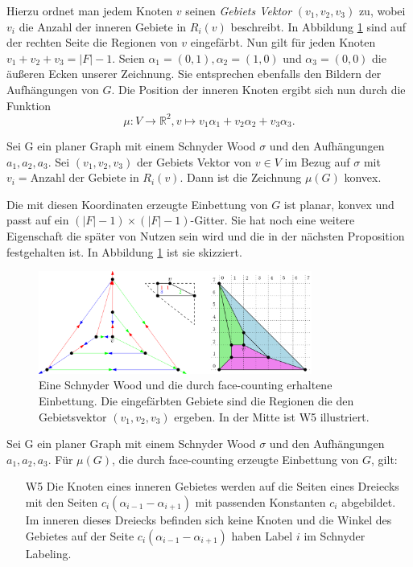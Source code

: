 Hierzu ordnet man jedem Knoten $v$ seinen \textit{Gebiets Vektor} $(v_1,v_2,v_3)$ zu, wobei $v_i$ die Anzahl der inneren Gebiete in $R_i(v)$ beschreibt. In Abbildung \ref{face_counting} sind auf der rechten Seite die Regionen von $v$ eingefärbt. Nun gilt für jeden Knoten $v_1+v_2+v_3 = |F|-1$. Seien $\alpha_1 = (0,1),\alpha_2 = (1,0)$ und $\alpha_3 = (0,0)$ die äußeren Ecken unserer Zeichnung. Sie entsprechen ebenfalls den Bildern der Aufhängungen von $G$. Die Position der inneren Knoten ergibt sich nun durch die Funktion 
$$\mu: V \to \mathbb{R}^2,v\mapsto v_1\alpha_1 + v_2\alpha_2+v_3\alpha_3.$$ 

\begin{theorem}
Sei G ein planer Graph mit einem Schnyder Wood $\sigma$ und den Aufhängungen $a_1,a_2,a_3$. Sei $(v_1,v_2,v_3)$ der Gebiets Vektor von $v \in V$ im Bezug auf $\sigma$ mit $ v_i = \text{Anzahl der Gebiete in }R_i(v).$ Dann ist die Zeichnung $\mu(G)$ konvex.
\end{theorem}

Die mit diesen Koordinaten erzeugte Einbettung von $G$ ist planar, konvex und passt auf ein $(|F|-1)\times(|F|-1)$-Gitter. Sie hat noch eine weitere Eigenschaft die später von Nutzen sein wird und die in der nächsten Proposition festgehalten ist.  In Abbildung \ref{face_counting} ist sie skizziert.

\begin{figure}
	\centering
  \includegraphics[width=0.8\textwidth]{face_counting.png}
	\caption{Eine Schnyder Wood und die durch face-counting erhaltene Einbettung. Die eingefärbten Gebiete sind die Regionen die den Gebietsvektor $(v_1,v_2,v_3)$ ergeben. In der Mitte ist W5 illustriert.}
	\label{face_counting}
\end{figure}

\begin{proposition}\label{w5}
Sei G ein planer Graph mit einem Schnyder Wood $\sigma$ und den Aufhängungen $a_1,a_2,a_3$. Für $\mu(G)$, die durch face-counting erzeugte Einbettung von $G$, gilt:
\begin{itemize}
\item [W5] Die Knoten eines inneren Gebietes werden auf die Seiten eines Dreiecks mit den Seiten $c_i(\alpha_{i-1}-\alpha_{i+1})$ mit passenden Konstanten $c_i$ abgebildet. Im inneren dieses Dreiecks befinden sich keine Knoten und die Winkel des Gebietes auf der Seite $c_i(\alpha_{i-1}-\alpha_{i+1})$ haben Label $i$ im Schnyder Labeling.
\end{itemize}
\end{proposition}


